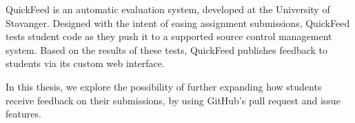 
\abstract

QuickFeed is an automatic evaluation system, developed at the University of Stavanger.
Designed with the intent of easing assignment submissions, QuickFeed tests student code as they push it to a supported source control management system.
Based on the results of these tests, QuickFeed publishes feedback to students via its custom web interface.

In this thesis, we explore the possibility of further expanding how students receive feedback on their submissions, by using GitHub's pull request and issue features.
